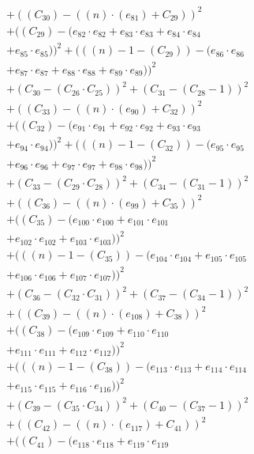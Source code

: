 \documentclass[10pt, a4paper]{article}
\begin{document}
\begin{small}
\begin{align*}
& + ((C_{30}) - ((n)  \cdot  (e_{81}) + C_{29}))^{2} \\
& + ((C_{29}) - (e_{82} \cdot e_{82} + e_{83} \cdot e_{83} + e_{84} \cdot e_{84} \\
& + e_{85} \cdot e_{85}))^{2} + (((n) - 1 - (C_{29})) - (e_{86} \cdot e_{86} \\
& + e_{87} \cdot e_{87} + e_{88} \cdot e_{88} + e_{89} \cdot e_{89}))^{2} \\
& + (C_{30} - (C_{26}  \cdot  C_{25}))^{2} + (C_{31} - (C_{28} - 1))^{2} \\
& + ((C_{33}) - ((n)  \cdot  (e_{90}) + C_{32}))^{2} \\
& + ((C_{32}) - (e_{91} \cdot e_{91} + e_{92} \cdot e_{92} + e_{93} \cdot e_{93} \\
& + e_{94} \cdot e_{94}))^{2} + (((n) - 1 - (C_{32})) - (e_{95} \cdot e_{95} \\
& + e_{96} \cdot e_{96} + e_{97} \cdot e_{97} + e_{98} \cdot e_{98}))^{2} \\
& + (C_{33} - (C_{29}  \cdot  C_{28}))^{2} + (C_{34} - (C_{31} - 1))^{2} \\
& + ((C_{36}) - ((n)  \cdot  (e_{99}) + C_{35}))^{2} \\
& + ((C_{35}) - (e_{100} \cdot e_{100} + e_{101} \cdot e_{101} \\
& + e_{102} \cdot e_{102} + e_{103} \cdot e_{103}))^{2} \\
& + (((n) - 1 - (C_{35})) - (e_{104} \cdot e_{104} + e_{105} \cdot e_{105} \\
& + e_{106} \cdot e_{106} + e_{107} \cdot e_{107}))^{2} \\
& + (C_{36} - (C_{32}  \cdot  C_{31}))^{2} + (C_{37} - (C_{34} - 1))^{2} \\
& + ((C_{39}) - ((n)  \cdot  (e_{108}) + C_{38}))^{2} \\
& + ((C_{38}) - (e_{109} \cdot e_{109} + e_{110} \cdot e_{110} \\
& + e_{111} \cdot e_{111} + e_{112} \cdot e_{112}))^{2} \\
& + (((n) - 1 - (C_{38})) - (e_{113} \cdot e_{113} + e_{114} \cdot e_{114} \\
& + e_{115} \cdot e_{115} + e_{116} \cdot e_{116}))^{2} \\
& + (C_{39} - (C_{35}  \cdot  C_{34}))^{2} + (C_{40} - (C_{37} - 1))^{2} \\
& + ((C_{42}) - ((n)  \cdot  (e_{117}) + C_{41}))^{2} \\
& + ((C_{41}) - (e_{118} \cdot e_{118} + e_{119} \cdot e_{119} \\

\end{align*}
\end{small}
\end{document}
